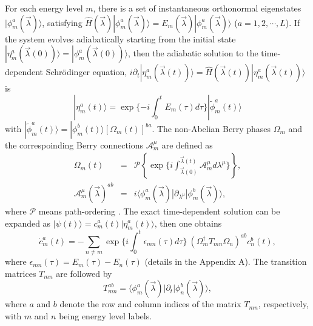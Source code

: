 \documentclass[aps,pra,twocolumn,groupedaddress,10pt]{revtex4}
\def\bea{\begin{eqnarray}} \def\eea{\end{eqnarray}}
\begin{document}
For each energy level $m$, there is a set of instantaneous
orthonormal eigenstates $|\phi^a_m(\vec{\lambda})\rangle$,
satisfying $\hat{H}(\vec{\lambda})|\phi^a_m(\vec{\lambda})\rangle =
E_m(\vec{\lambda})|\phi^a_m(\vec{\lambda})\rangle$ ($a = 1, 2, \cdots, L$).
If the system evolves adiabatically starting from the initial
state
$|\eta_{m}^a(\vec{\lambda}(0))\rangle = |\phi_{m}^a(\vec{\lambda}(0))\rangle$,
then the adiabatic solution to the time-dependent Schr\"odinger equation,
$i \partial_t |\eta_{m}^a(\vec{\lambda}(t))\rangle
= \hat{H}(\vec{\lambda}(t))|\eta_{m}^a(\vec{\lambda}(t))\rangle$ is
\begin{equation}\label{eta}
|\eta_{m}^a(t)\rangle = \exp\{-i\int_0^t E_{m}(\tau)d\tau\}|\tilde{\phi}_{m}^a(t)\rangle
\end{equation}
with
$|\tilde{\phi}_{m}^a(t)\rangle = |\phi_{m}^b(t)\rangle[\Omega_{m}(t)]^{ba}$.
The non-Abelian Berry phases $\Omega_{m}$ and the correspoinding
Berry connections $\mathcal{A}_{m}^{\mu}$ are defined as
\bea
\Omega_{m}(t) &=& \mathcal{P}\left\{\exp
\Big\{i\int_{\vec{\lambda}(0)}^{\vec{\lambda}(t)} \mathcal{A}^\mu_{m}
d\lambda^{\mu}\Big\}\right \}, \\
\label{A}
\mathcal{A}_{m}^{\mu}(\vec{\lambda})^{ab} &=& i\langle\phi_{m}^{a}(\vec{\lambda})|\partial_{\lambda^{\mu}}|\phi_{m}^{b}(\vec{\lambda})\rangle
\label{omega},
\eea
where $\mathcal{P}$ means path-ordering \cite{wilczek1984appearance}.
The exact time-dependent solution can be expanded
as $|\psi(t)\rangle = c_{m}^a(t) |\eta_{m}^a(t)\rangle $, then one obtains
\begin{equation}
\dot{c}_{m}^{a}(t) = - \sum_{n\neq m}\exp
\Big \{i\int_0^t\epsilon_{mn}(\tau)d\tau\Big\}
~(\Omega_{m}^{\dag}T_{mn}\Omega_{n})^{ab}c_{n}^{b}(t),
\label{eq:time}
\end{equation}
where $\epsilon_{mn}(\tau) = E_m(\tau) - E_n(\tau)$
(details in the Appendix A).
The transition matrices $T_{mn}$ are followed by
\begin{equation}\label{tran}
	T^{ab}_{mn} = \langle\phi_{m}^a(\vec{\lambda})
|\partial_t|\phi_{n}^b(\vec{\lambda})\rangle,
\end{equation}
where $a$ and $b$ denote the row and column indices
of the matrix $T_{mn}$, respectively,
with $m$ and $n$ being energy level labels.
\end{document}
